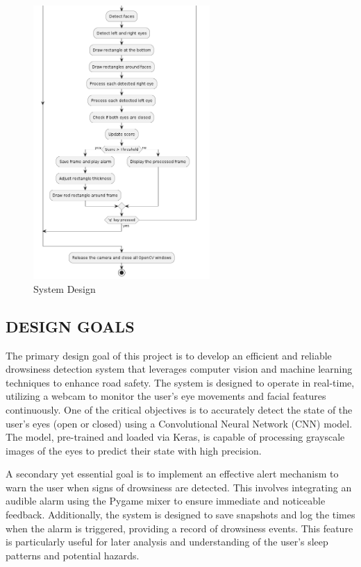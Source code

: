 \documentclass[12pt]{article}
\begin{document}
\begin{figure}[h]
\centering
\includegraphics[width=0.6\textwidth]{flow2}
\caption{System Design}
\end{figure}
\FloatBarrier

\subsection{DESIGN GOALS }

The primary design goal of this project is to develop an efficient and reliable drowsiness detection system that leverages computer vision and machine learning techniques to enhance road safety. The system is designed to operate in real-time, utilizing a webcam to monitor the user's eye movements and facial features continuously. One of the critical objectives is to accurately detect the state of the user's eyes (open or closed) using a Convolutional Neural Network (CNN) model. The model, pre-trained and loaded via Keras, is capable of processing grayscale images of the eyes to predict their state with high precision.

A secondary yet essential goal is to implement an effective alert mechanism to warn the user when signs of drowsiness are detected. This involves integrating an audible alarm using the Pygame mixer to ensure immediate and noticeable feedback. Additionally, the system is designed to save snapshots and log the times when the alarm is triggered, providing a record of drowsiness events. This feature is particularly useful for later analysis and understanding of the user's sleep patterns and potential hazards.
\end{document}
